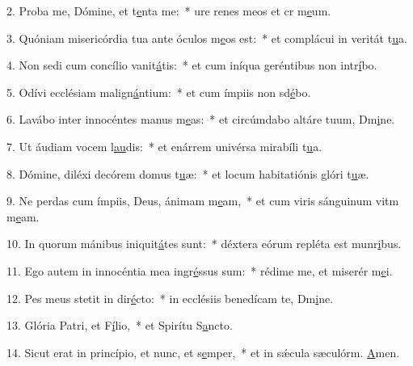 2. Proba me, Dómine, et t\uline{e}nta me:~* ure renes meos et cr m\uline{e}um.\par 
3. Quóniam misericórdia tua ante óculos m\uline{e}os est:~* et complácui in veritát t\uline{u}a.\par 
4. Non sedi cum concílio vanit\uline{á}tis:~* et cum iníqua geréntibus non intr\uline{í}bo.\par 
5. Odívi ecclésiam malign\uline{á}ntium:~* et cum ímpiis non sd\uline{é}bo.\par 
6. Lavábo inter innocéntes manus m\uline{e}as:~* et circúmdabo altáre tuum, Dm\uline{i}ne.\par 
7. Ut áudiam vocem l\uline{au}dis:~* et enárrem univérsa mirabíli t\uline{u}a.\par 
8. Dómine, diléxi decórem domus t\uline{u}æ:~* et locum habitatiónis glóri t\uline{u}æ.\par 
9. Ne perdas cum ímpiis, Deus, ánimam m\uline{e}am,~* et cum viris sánguinum vitm m\uline{e}am.\par 
10. In quorum mánibus iniquit\uline{á}tes sunt:~* déxtera eórum repléta est munr\uline{i}bus.\par 
11. Ego autem in innocéntia mea ingr\uline{é}ssus sum:~* rédime me, et miserér m\uline{e}i.\par 
12. Pes meus stetit in dir\uline{é}cto:~* in ecclésiis benedícam te, Dm\uline{i}ne.\par 
13. Glória Patri, et F\uline{í}lio,~* et Spirítu S\uline{a}ncto.\par 
14. Sicut erat in princípio, et nunc, et s\uline{e}mper,~* et in sǽcula sæculórm. \uline{A}men.\par 
